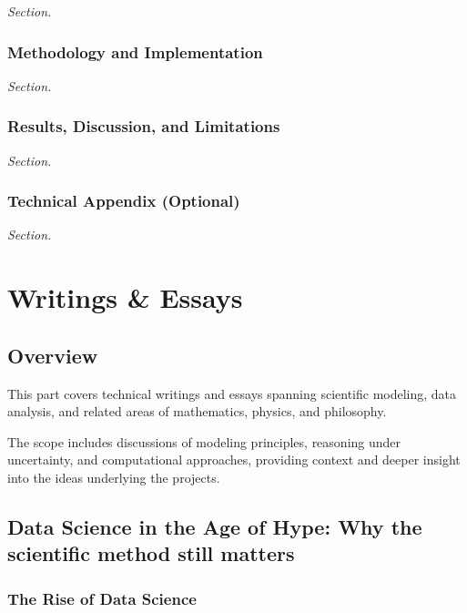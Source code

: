 \documentclass[
  12pt,
  letterpaper,
]{book}
\begin{document}
\emph{Section.}

\section{Methodology and
Implementation}\label{methodology-and-implementation-11}

\emph{Section.}

\section{Results, Discussion, and
Limitations}\label{results-discussion-and-limitations-11}

\emph{Section.}

\section{Technical Appendix
(Optional)}\label{technical-appendix-optional-10}

\emph{Section.}

\part{Writings \& Essays}

\chapter*{Overview}\label{overview-5}


This part covers technical writings and essays spanning scientific
modeling, data analysis, and related areas of mathematics, physics, and
philosophy.

The scope includes discussions of modeling principles, reasoning under
uncertainty, and computational approaches, providing context and deeper
insight into the ideas underlying the projects.

\chapter{Data Science in the Age of Hype: Why the scientific method
still
matters}\label{data-science-in-the-age-of-hype-why-the-scientific-method-still-matters}

\section{The Rise of Data Science}\label{the-rise-of-data-science}
\end{document}
